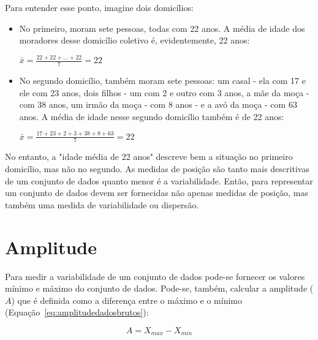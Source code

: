 \documentclass[11pt,fleqn]{book} %
\begin{document}
Para entender esse ponto, imagine dois domicílios:

\begin{itemize}

\item No primeiro, moram sete pessoas, todas com 22 anos. A média de idade dos moradores desse domicílio coletivo é, evidentemente, 22 anos:
\begin{center}
$\displaystyle \bar{x}=\frac{22+22+...+22}{7}=22$
\end{center}

\item No segundo domicílio, também moram sete pessoas: um casal - ela com 17 e ele com 23 anos, dois filhos - um com 2 e outro com 3 anos, a mãe da moça - com 38 anos, um irmão da moça - com 8 anos - e a avó da moça - com 63 anos. A média de idade nesse segundo domicílio também é de 22 anos: 

\begin{center}
$\displaystyle \bar{x}=\frac{17+23+2+3+38+8+63}{7}=22$
\end{center}

\end{itemize}

No entanto, a "idade média de 22 anos" descreve bem a situação no primeiro domicílio, mas não no segundo. As medidas de posição são tanto mais descritivas de um conjunto de dados quanto menor é a variabilidade. Então, para representar um conjunto de dados devem ser fornecidas não apenas medidas de posição, mas também uma medida de variabilidade ou dispersão. \\


\section{Amplitude}

Para medir a variabilidade de um conjunto de dados pode-se fornecer os valores mínimo e máximo do conjunto de dados. Pode-se, também, calcular a amplitude ($A$) que é definida como a diferença entre o máximo e o mínimo (Equação~\ref{eq:amplitudedadosbrutos}):

\begin{eBox}
\vspace{-0.5cm}
\begin{equation} \label{eq:amplitudedadosbrutos}
A=X_{max}-X_{min} 
\end{equation}
\end{eBox}
\end{document}
